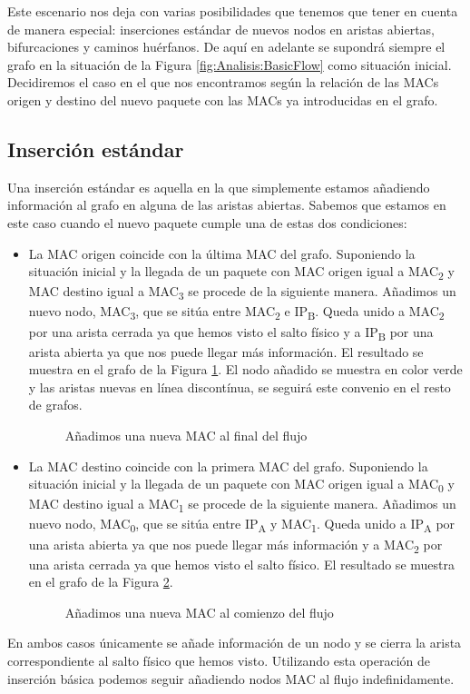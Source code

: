 \documentclass[twoside, 12pt]{epstfg}
\begin{document}
Este escenario nos deja con varias posibilidades que tenemos que tener en cuenta de manera especial: inserciones estándar de nuevos nodos en aristas abiertas, bifurcaciones y caminos huérfanos. De aquí en adelante se supondrá siempre el grafo en la situación de la Figura \ref{fig:Analisis:BasicFlow} como situación inicial. Decidiremos el caso en el que nos encontramos según la relación de las MACs origen y destino del nuevo paquete con las MACs ya introducidas en el grafo.

\subsection{Inserción estándar}
Una inserción estándar es aquella en la que simplemente estamos añadiendo información al grafo en alguna de las aristas abiertas. Sabemos que estamos en este caso cuando el nuevo paquete cumple una de estas dos condiciones:
\begin{itemize}
    \item La MAC origen coincide con la última MAC del grafo. Suponiendo la situación inicial y la llegada de un paquete con MAC origen igual a MAC\textsubscript{2} y MAC destino igual a MAC\textsubscript{3} se procede de la siguiente manera. Añadimos un nuevo nodo, MAC\textsubscript{3}, que se sitúa entre MAC\textsubscript{2} e IP\textsubscript{B}. Queda unido a  MAC\textsubscript{2} por una arista cerrada ya que hemos visto el salto físico y a IP\textsubscript{B} por una arista abierta ya que nos puede llegar más información. El resultado se muestra en el grafo de la Figura \ref{fig:Analisis:AddingLast}. El nodo añadido se muestra en color verde y las aristas nuevas en línea discontínua, se seguirá este convenio en el resto de grafos.
    \begin{figure}[H]
    \centering
    
    \caption[Ejemplo inserción básica 1]{Añadimos una nueva MAC al final del flujo}
    \label{fig:Analisis:AddingLast}
    \end{figure}
    \item La MAC destino coincide con la primera MAC del grafo. Suponiendo la situación inicial y la llegada de un paquete con MAC origen igual a MAC\textsubscript{0} y MAC destino igual a MAC\textsubscript{1} se procede de la siguiente manera. Añadimos un nuevo nodo, MAC\textsubscript{0}, que se sitúa entre IP\textsubscript{A} y MAC\textsubscript{1}. Queda unido a IP\textsubscript{A} por una arista abierta ya que nos puede llegar más información y a  MAC\textsubscript{2} por una arista cerrada ya que hemos visto el salto físico. El resultado se muestra en el grafo de la Figura \ref{fig:Analisis:AddingFirst}.
    \begin{figure}[H]
    \centering
    
    \caption[Ejemplo inserción básica 2]{Añadimos una nueva MAC al comienzo del flujo}
    \label{fig:Analisis:AddingFirst}
    \end{figure}
\end{itemize}
En ambos casos únicamente se añade información de un nodo y se cierra la arista correspondiente al salto físico que hemos visto. Utilizando esta operación de inserción básica podemos seguir añadiendo nodos MAC al flujo indefinidamente.
\end{document}

